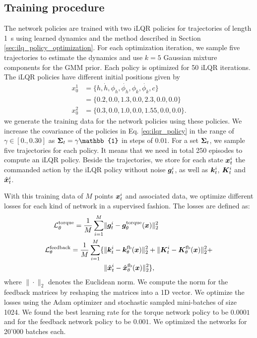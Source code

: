 \subsection{Training procedure}
%
The network policies are trained with two iLQR policies for trajectories of length \SI{1}{\second} using learned dynamics and the method described in Section \ref{sec:ilq_policy_optimization}. For each optimization iteration, we sample five trajectories to estimate the dynamics and use $k=5$ Gaussian mixture components for the GMM prior. Each policy is optimized for 50 iLQR iterations. The iLQR policies have different initial positions given by
%
\begin{align}
x^1_0 & =  \{h, \dot{h}, \phi_h, \dot{\phi_h}, \phi_k, \dot{\phi_k}, c\}\\
  & = \{0.2, 0.0, 1.3, 0.0, 2.3, 0.0, 0.0\} \nonumber \\
x^2_0 & = \{0.3, 0.0, 1.0, 0.0, 1.55, 0.0, 0.0\}.
\end{align}
%
we generate the training data for the network policies using these policies. We increase the covariance of the policies in Eq. \eqref{eq:ilqr_policy} in the range of $\gamma \in [0., 0.30]$ as $\b{\Sigma}_t=\gamma \mathbb{1}$ in steps of $0.01$. For a set $\bm{\Sigma}_t$, we sample five trajectories for each policy. It means that we need in total 250 episodes to compute an iLQR policy. Beside the trajectories, we store for each state $\bm{x}^i_t$ the commanded action by the iLQR policy without noise $\bm{g}^i_t$, as well as $\bm{k}^i_t$, $\bm{K}^i_t$ and $\hat{\bm{x}}^i_t$.

With this training data of $M$ points $\bm{x}^i_t$ and associated data, we optimize different losses for each kind of network in a supervised fashion. The losses are defined as:
%
\begin{align}
\label{eq:loss_nn_feedback}
\mathcal{L}^{\text{torque}}_\theta = \frac{1}{M} \sum^{M}_{i=1} &\|\bm{g}^i_t - \bm{g}^\text{torque}_\theta(\bm{x})\|^2_2 \\
\mathcal{L}^{\text{feedback}}_\theta = \frac{1}{M} \sum^{M}_{i=1} \{&\|\bm{k}^i_t - \bm{k}^\text{fb}_\theta(\bm{x})\|^2_2 + \|\bm{K}^i_t - \bm{K}^\text{fb}_\theta(\bm{x})\|^2_2  \nonumber + \\
& \|\hat{\bm{x}}^i_t - \hat{\bm{x}}^\text{fb}_\theta(\bm{x})\|^2_2 \} \nonumber,
\end{align}
%
where $\|\cdot\|_2$ denotes the Euclidean norm. We compute the norm for the feedback matrices by reshaping the matrices into a 1D vector. We optimize the losses using the Adam optimizer and stochastic sampled mini-batches of size 1024. We found the best learning rate for the torque network policy to be $0.0001$ and for the feedback network policy to be $0.001$. We optimized the networks for 20'000 batches each.
%
%
